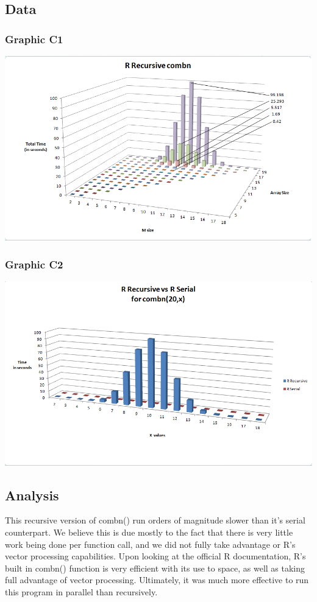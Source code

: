 \documentclass[titlepage, 11pt]{article}
\begin{document}
\subsection{Data}
\subsubsection{Graphic C1}
\includegraphics[scale = 0.5]{images/3D-R} \\
\subsubsection{Graphic C2}
\includegraphics[scale = 0.5]{images/RvsR.png}

\subsection{Analysis}
This recursive version of combn() run orders of magnitude slower than it's serial counterpart. We believe this is due mostly to the fact that there is very little work being done per function call, and we did not fully take advantage or R's vector processing capabilities. Upon looking at the official R documentation, R's built in combn() function is very efficient with its use to space, as well as taking full advantage of vector processing. Ultimately, it was much more effective to run this program in parallel than recursively.
\end{document}
